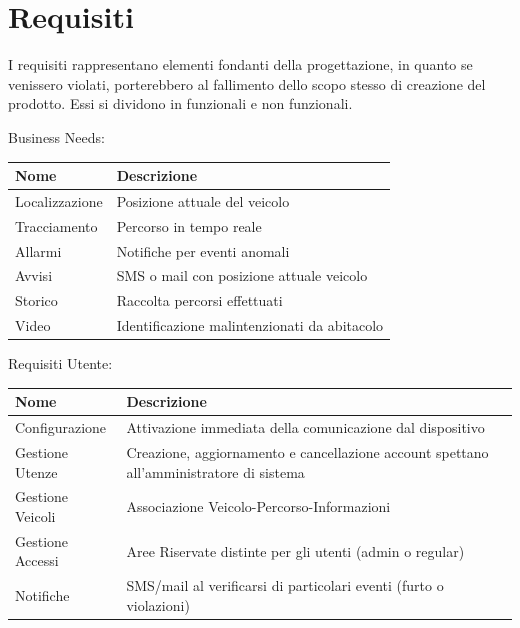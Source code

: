 \documentclass[a4paper,12pt]{article}
\begin{document}
\pagebreak

\section{Requisiti}
I requisiti rappresentano elementi fondanti della progettazione, in quanto se venissero violati, porterebbero al fallimento dello scopo stesso di creazione del prodotto. Essi si dividono in funzionali e non funzionali.

\begin{table}[h]
Business Needs:
\begin{center}
\begin{tabular}{ p{}  p{} }
\rowcolor{Ash}	
\hline	
Nome & Descrizione \\ \hline
Localizzazione & Posizione attuale del veicolo \\ 
Tracciamento & Percorso in tempo reale \\ 
Allarmi & Notifiche per eventi anomali \\ 
Avvisi & SMS o mail con posizione attuale veicolo \\ 
Storico & Raccolta percorsi effettuati \\ 
Video & Identificazione malintenzionati da abitacolo \\ \hline
\end{tabular}
\end{center}
\end{table}

\begin{table}[h]
Requisiti Utente:
\begin{center}
\begin{tabular}{ p{}  p{} }
\rowcolor{Ash}	
\hline	
Nome & Descrizione \\ \hline
Configurazione & Attivazione immediata della comunicazione dal dispositivo \\ 
Gestione Utenze & Creazione, aggiornamento e cancellazione account spettano all'amministratore di sistema \\ 
Gestione Veicoli & Associazione Veicolo-Percorso-Informazioni \\ 
Gestione Accessi &  Aree Riservate distinte per gli utenti (admin o regular) \\ 
Notifiche &  SMS/mail al verificarsi di particolari eventi (furto o violazioni)\\ \hline
\end{tabular}
\end{center}
\end{table}
\end{document}
